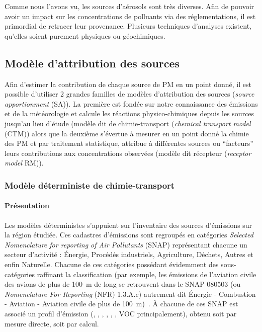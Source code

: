 Comme nous l'avons vu, les sources d'aérosols sont très diverses.
Afin de pouvoir avoir un impact sur les concentrations de polluants via des
réglementations, il est primordial de
retracer leur provenance. Plusieurs techniques d'analyses existent, qu'elles soient purement
physiques ou géochimiques.

\subsection{Modèle d'attribution des sources}%
\label{sec:source_apportionment_model}

Afin d'estimer la contribution de chaque source de PM en un point donné, il est possible
d'utiliser 2 grandes familles de modèles d'attribution des sources (\textit{source
apportionment} (SA)). La première est fondée sur notre connaissance des
émissions et de la météorologie et calcule les réactions physico-chimiques depuis les
sources jusqu'au lieu d'étude (modèle dit de chimie-transport (\textit{chemical transport
model} (CTM)) alors que la deuxième s'évertue à mesurer en un point donné
la chimie des PM et par traitement statistique, attribue à différentes sources ou
``facteurs'' leurs contributions aux concentrations observées (modèle dit récepteur
(\textit{receptor model} RM)).

\subsubsection{Modèle déterministe de chimie-transport}%
\label{ssub:modele_deterministe_de_chimietransport}

\paragraph{Présentation}%
\label{par:presentation}

Les modèles déterministes s'appuient sur l'inventaire des sources d'émissions sur la
région étudiée. Ces cadastres d'émissions sont regroupés en catégories \textit{Selected
Nomenclature for reporting of Air Pollutants} (SNAP) représentant chacune un secteur
d'activité : Énergie, Procédés industriels, Agriculture, Déchets, Autres et enfin
Naturelle.
Chacune de ces catégories possédant évidemment des sous-catégories raffinant la
classification (par exemple, les émissions de l'aviation civile des avions de plus de \SI{100}{m} de
long se retrouvent dans le SNAP 080503 (ou \textit{Nomenclature For Reporting} (NFR)
1.3.A.c) autrement dit Énergie - Combustion - Aviation - Aviation civile de plus de
\SI{100}{m})~\autocite{europeanenvironmentagencyEMEP2019}.
À chacune de ces SNAP est associé un profil d'émission (, , , , \PMdix, \PMdc,
VOC principalement), obtenu soit par mesure directe, soit par calcul.

